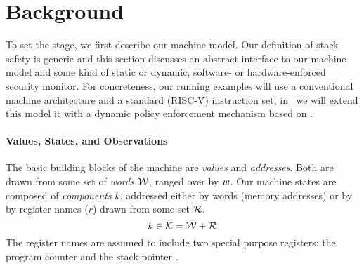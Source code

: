 \documentclass[acmsmall,review,anonymous]{acmart}\settopmatter{printfolios=true,printccs=false,printacmref=false}
\begin{document}

%




\section{Background}
\label{sec:prelim}

To set the stage, we first
describe our machine model. Our definition of stack safety is
generic and this section discusses an abstract interface to our
machine model and some kind of static or dynamic, software- or
hardware-enforced security monitor.  For
concreteness, our running examples will use a
conventional machine architecture and a standard (RISC-V) instruction set;
in~ we will
extend this model it with a dynamic policy enforcement mechanism based
on .

\paragraph*{Values, States, and Observations}

The basic building blocks of the machine are {\em values} and {\em
  addresses}. Both are drawn from some set of {\em words}
${\mathcal W}$, ranged over by $w$.
%
Our machine states are composed of {\em components} $k$, addressed either by
words (memory addresses) or by by register names ($r$) drawn from some set
${\mathcal R}$.
%
    \[k \in {\mathcal K} = {\mathcal W} + {\mathcal R} \]
%
The register names are assumed to include two special purpose registers: the
program counter {\PCname} and the stack pointer \SP.
\end{document}
